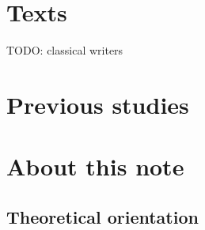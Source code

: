 \documentclass[a4paper, oneside]{report}
\begin{document}
\section{Texts}

TODO: classical writers

\section{Previous studies}

\section{About this note}

\subsection{Theoretical orientation}
\end{document}
